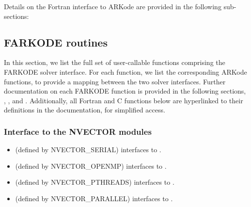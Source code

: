 \documentclass[letterpaper,10pt,english]{sphinxmanual}
\begin{document}
Details on the Fortran interface to ARKode are provided in the
following sub-sections:


\subsection{FARKODE routines}
\label{f_interface/Routines:finterface-routines}\label{f_interface/Routines::doc}\label{f_interface/Routines:farkode-routines}
In this section, we list the full set of user-callable functions
comprising the FARKODE solver interface.  For each function, we list
the corresponding ARKode functions, to provide a mapping between the
two solver interfaces.  Further documentation on each FARKODE function
is provided in the following sections, {\hyperref[f_interface/Usage:finterface-usage]{\emph{}}},
{\hyperref[f_interface/Optional_output:finterface-optionaloutputs]{\emph{}}}, {\hyperref[f_interface/Rootfinding:finterface-rootfinding]{\emph{}}} and
{\hyperref[f_interface/Preconditioning:finterface-preconditioning]{\emph{}}}.  Additionally, all Fortran and C
functions below are hyperlinked to their definitions in the
documentation, for simplified access.


\subsubsection{Interface to the NVECTOR modules}
\label{f_interface/Routines:interface-to-the-nvector-modules}\begin{itemize}
\item {} 
{\hyperref[f_interface/Usage:f/_/FNVINITS]{\emph{}}} (defined by NVECTOR\_SERIAL) interfaces to
{\hyperref[nvectors/NVector_Serial:c.N_VNewEmpty_Serial]{\emph{}}}.

\item {} 
{\hyperref[f_interface/Usage:f/_/FNVINITOMP]{\emph{}}} (defined by NVECTOR\_OPENMP) interfaces to
{\hyperref[nvectors/NVector_OpenMP:c.N_VNewEmpty_OpenMP]{\emph{}}}.

\item {} 
{\hyperref[f_interface/Usage:f/_/FNVINITPTS]{\emph{}}} (defined by NVECTOR\_PTHREADS) interfaces to
{\hyperref[nvectors/NVector_Pthreads:c.N_VNewEmpty_Pthreads]{\emph{}}}.

\item {} 
{\hyperref[f_interface/Usage:f/_/FNVINITP]{\emph{}}} (defined by NVECTOR\_PARALLEL) interfaces to
{\hyperref[nvectors/NVector_Parallel:c.N_VNewEmpty_Parallel]{\emph{}}}.

\end{itemize}
\end{document}
